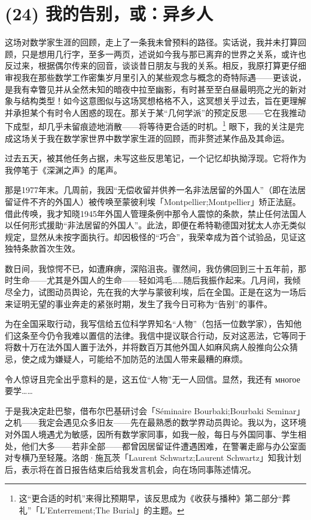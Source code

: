 \section{(24) 我的告别，或：异乡人}

这场对数学家生涯的回顾，走上了一条我未曾预料的路径。实话说，我并未打算回顾，只是想用几行字，至多一两页，述说如今我与那已离弃的世界之关系，或许也反过来，根据偶尔传来的回音，谈谈昔日朋友与我的关系。相反，我原打算更仔细审视我在那些数学工作密集岁月里引入的某些观念与概念的奇特际遇——更该说，是我有幸瞥见并从全然未知的暗夜中拉至幽影，有时甚至至白昼最明亮之光的新对象与结构类型！如今这意图似与这场冥想格格不入，这冥想关乎过去，旨在更理解并承担某个有时令人困惑的现在。那关于某“几何学派”的预定反思——它在我推动下成型，却几乎未留痕迹地消散——将等待更合适的时机。\footnote{这“更合适的时机”来得比预期早，该反思成为《收获与播种》第二部分“葬礼”「L’Enterrement;The Burial」的主题。} 眼下，我的关注是完成这场关于我在数学家世界中数学家生涯的回顾，而非赘述某作品及其命运。

过去五天，被其他任务占据，未写这些反思笔记，一个记忆却执拗浮现。它将作为我停笔于《深渊之声》的尾声。

那是1977年末。几周前，我因“无偿收留并供养一名非法居留的外国人”（即在法居留证件不齐的外国人）被传唤至蒙彼利埃「Montpellier;Montpellier」矫正法庭。借此传唤，我才知晓1945年外国人管理条例中那令人震惊的条款，禁止任何法国人以任何形式援助“非法居留的外国人”。此法，即便在希特勒德国对犹太人亦无类似规定，显然从未按字面执行。却因极怪的“巧合”，我荣幸成为首个试验品，见证这独特条款首次生效。

数日间，我惊愕不已，如遭麻痹，深陷沮丧。骤然间，我仿佛回到三十五年前，那时生命——尤其是外国人的生命——轻如鸿毛……随后我振作起来。几月间，我倾尽全力，试图动员舆论，先在我的大学与蒙彼利埃，后在全国。正是在这为一场后来证明无望的事业奔走的紧张时期，发生了我今日可称为“告别”的事件。

为在全国采取行动，我写信给五位科学界知名“人物”（包括一位数学家），告知他们这条至今仍令我难以置信的法律。我信中提议联合行动，反对这恶法，它等同于将数十万在法外国人置于法外，并将数百万其他外国人如麻风病人般推向公众猜忌，使之成为嫌疑人，可能给不加防范的法国人带来最糟的麻烦。

令人惊讶且完全出乎意料的是，这五位“人物”无一人回信。显然，我还有 многое要学……

于是我决定赴巴黎，借布尔巴基研讨会「Séminaire Bourbaki;Bourbaki Seminar」之机——我定会遇见众多旧友——先在最熟悉的数学界动员舆论。我以为，这环境对外国人境遇尤为敏感，因所有数学家同事，如我一般，每日与外国同事、学生相处，他们大多——若非全部——都曾因居留证件遭遇困难，在警署走廊与办公室面对专横乃至轻蔑。洛朗·施瓦茨「Laurent Schwartz;Laurent Schwartz」知我计划后，表示将在首日报告结束后给我发言机会，向在场同事陈述情况。

